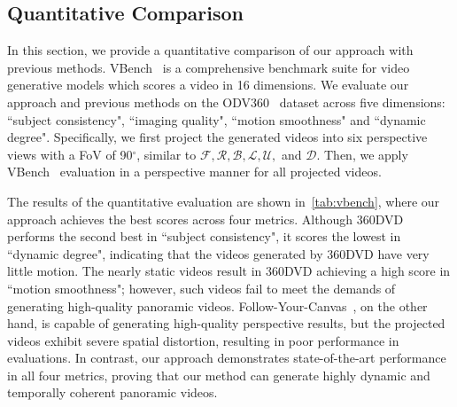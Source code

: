 \subsection{Quantitative Comparison}
In this section, we provide a quantitative comparison of our approach with previous methods. 
%
VBench~\cite{huang2023vbench} is a comprehensive benchmark suite for video generative models which scores a video in 16 dimensions.
%
We evaluate our approach and previous methods on the ODV360~\cite{cao2023ntire} dataset across five dimensions: ``subject consistency", ``imaging quality", ``motion smoothness" and ``dynamic degree".
%
Specifically, we first project the generated videos into six perspective views with a FoV of 90$^\circ$, similar to $\mathcal{F,R,B,L,U,}$ and $\mathcal{D}$.
%
Then, we apply VBench~\cite{huang2023vbench} evaluation in a perspective manner for all projected videos.
%

The results of the quantitative evaluation are shown in~\cref{tab:vbench}, where our approach achieves the best scores across four metrics.
%
Although 360DVD~\cite{wang2024360dvd} performs the second best in ``subject consistency", it scores the lowest in ``dynamic degree", indicating that the videos generated by 360DVD have very little motion. 
%
The nearly static videos result in 360DVD achieving a high score in ``motion smoothness"; however, such videos fail to meet the demands of generating high-quality panoramic videos. 
%
Follow-Your-Canvas~\cite{chen2024follow}, on the other hand, is capable of generating high-quality perspective results, but the projected videos exhibit severe spatial distortion, resulting in poor performance in evaluations.
%
In contrast, our approach demonstrates state-of-the-art performance in all four metrics, proving that our method can generate highly dynamic and temporally coherent panoramic videos.


    

